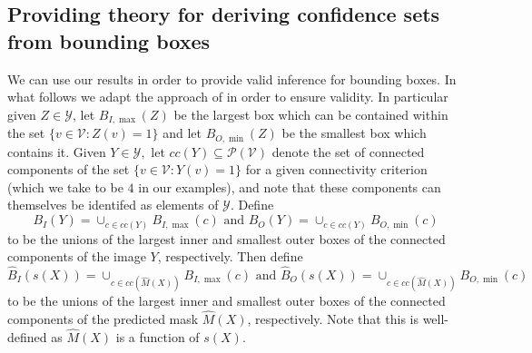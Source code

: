 \subsection{Providing theory for deriving confidence sets from bounding boxes}\label{AA:BBtheory}
We can use our results in order to provide valid inference for bounding boxes.  In what follows we adapt the approach of \cite{Andeol2023} in order to ensure validity. In particular given $Z \in \mathcal{Y}$, let $B_{I, \max}(Z)$ be the largest box which can be contained within the set $\lbrace v\in \mathcal{V}: Z(v) = 1 \rbrace$ and let $ B_{O, \min}(Z)$ be the smallest box which contains it. Given $Y \in \mathcal{Y}, $ let $cc(Y) \subseteq \mathcal{P}(\mathcal{V})$ denote the set of connected components of the set $\lbrace v\in \mathcal{V}: Y(v) = 1 \rbrace$ for a given connectivity criterion (which we take to be $4$ in our examples), and note that these components can themselves be identifed as elements of $\mathcal{Y}$. Define 
$$B_I(Y) = \cup_{c \in cc(Y)} B_{I, \max}(c) \text{ and } B_O(Y) = \cup_{c \in cc(Y)} B_{O, \min}(c)$$
to be the unions of the largest inner and smallest outer boxes of the connected components of the image $Y$, respectively. Then define
$$\hat{B}_I(s(X)) = \cup_{c \in cc(\hat{M}(X)) } B_{I, \max}(c) \text{ and } \hat{B}_O(s(X)) = \cup_{c \in cc(\hat{M}(X))} B_{O, \min}(c)$$
to be the unions of the largest inner and smallest outer boxes of the connected components of the predicted mask $\hat{M}(X)$, respectively. Note that this is well-defined as $\hat{M}(X)$ is a function of $s(X)$.

